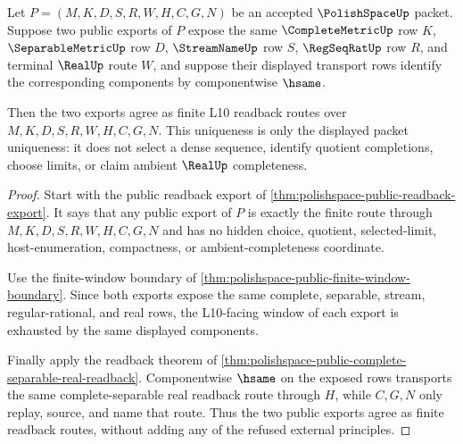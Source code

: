 \begin{theorem}
\label{thm:polishspace-public-readback-uniqueness}
Let $P=(M,K,D,S,R,W,H,C,G,N)$ be an accepted $\PolishSpaceUp$ packet. Suppose two public exports of $P$ expose the same $\CompleteMetricUp$ row $K$, $\SeparableMetricUp$ row $D$, $\StreamNameUp$ row $S$, $\RegSeqRatUp$ row $R$, and terminal $\RealUp$ route $W$, and suppose their displayed transport rows identify the corresponding components by componentwise $\hsame$.

Then the two exports agree as finite L10 readback routes over $M,K,D,S,R,W,H,C,G,N$. This uniqueness is only the displayed packet uniqueness: it does not select a dense sequence, identify quotient completions, choose limits, or claim ambient $\RealUp$ completeness.
\end{theorem}
\begin{proof}
Start with the public readback export of \autoref{thm:polishspace-public-readback-export}. It says that any public export of $P$ is exactly the finite route through $M,K,D,S,R,W,H,C,G,N$ and has no hidden choice, quotient, selected-limit, host-enumeration, compactness, or ambient-completeness coordinate.

Use the finite-window boundary of \autoref{thm:polishspace-public-finite-window-boundary}. Since both exports expose the same complete, separable, stream, regular-rational, and real rows, the L10-facing window of each export is exhausted by the same displayed components.

Finally apply the readback theorem of \autoref{thm:polishspace-public-complete-separable-real-readback}. Componentwise $\hsame$ on the exposed rows transports the same complete-separable real readback route through $H$, while $C,G,N$ only replay, source, and name that route. Thus the two public exports agree as finite readback routes, without adding any of the refused external principles.
\end{proof}

